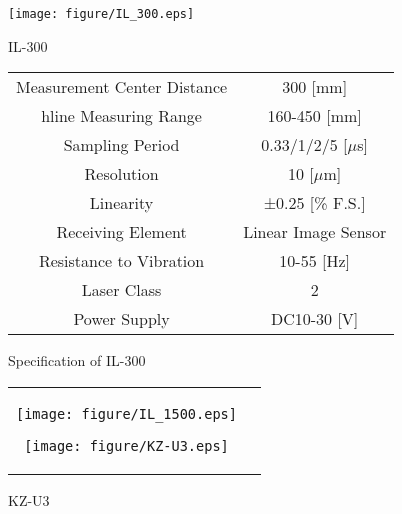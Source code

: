 \documentclass[a4paper,12pt]{article_vdlab_sotsuron}
\begin{document}
\vspace*{2mm}
\begin{figure}[htp]
  \begin{minipage}{0.3\hsize}
     \begin{center}
     \vspace*{5mm}
      \texttt{[image: figure/IL\_300.eps]}
      \vspace*{3mm}
      \caption{IL-300}
      \label{IL-300}
    \end{center}
  \end{minipage}
\begin{minipage}{0.6\hsize}
\makeatletter
\def\@captype{table}
\makeatother
  \begin{center}
    \caption{Specification of IL-300}
      \label{tab:IL-300}
      \begin{tabular}{cc}\hline
	Measurement Center Distance & 300 [mm] \\hline
	Measuring Range & 160-450 [mm] \\
	Sampling Period & 0.33/1/2/5 [$\mu$s] \\
	Resolution & 10 [$\mu$m] \\
	Linearity & ±0.25 [\% F.S.] \\
	Receiving Element & Linear Image Sensor \\
	Resistance to Vibration & 10-55 [Hz] \\
	Laser Class & 2 \\
	Power Supply & DC10-30 [V] \\\hline
	\end{tabular}
      \end{center}
    \end{minipage}
\end{figure}

\vspace*{15mm}
\begin{figure}[htp]
\begin{tabular}{cc}
\begin{minipage}{0.4\hsize}
\centering
   \texttt{[image: figure/IL\_1500.eps]}
\vspace*{3mm}
\caption{IL-1500}
\label{IL-1500}
\end{minipage}
\begin{minipage}{0.45\hsize}
\centering
   \texttt{[image: figure/KZ-U3.eps]}
\vspace*{3mm}
\caption{KZ-U3}
\label{KZ-U3}
\end{minipage}
\end{tabular}
\end{figure}
\end{document}
